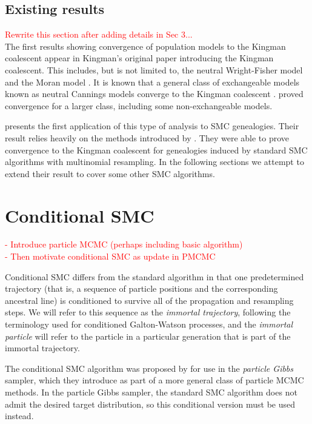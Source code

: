 \documentclass[fleqn]{article}
\theoremstyle{definition}
\begin{document}
\subsection{Existing results}
\textcolor{red}{
Rewrite this section after adding details in Sec 3...
}\\
The first results showing convergence of population models to the Kingman coalescent appear in Kingman's original paper \citep{kingman1982gene} introducing the Kingman coalescent. This includes, but is not limited to, the neutral Wright-Fisher model \citep{fisher1923, fisher1930, wright1931} and the Moran model \citep{moran1958}.
It is known that a general class of exchangeable models known as neutral Cannings models converge to the Kingman coalescent \citep[Section 2.2]{etheridge2011}.
\citet{mohle1998} proved convergence for a larger class, including some non-exchangeable models.

\citet{koskela2018} presents the first application of this type of analysis to SMC genealogies. Their result relies heavily on the methods introduced by \citet{mohle1998}.
They were able to prove convergence to the Kingman coalescent for genealogies induced by standard SMC algorithms with multinomial resampling.
In the following sections we attempt to extend their result to cover some other SMC algorithms.


\section{Conditional SMC}\label{sec:conditionalSMC}
\textcolor{red}{
- Introduce particle MCMC (perhaps including basic algorithm)\\
- Then motivate conditional SMC as update in PMCMC\\
}

Conditional SMC differs from the standard algorithm in that one predetermined trajectory (that is, a sequence of particle positions and the corresponding ancestral line) is conditioned to survive all of the propagation and resampling steps. 
We will refer to this sequence as the \emph{immortal trajectory}, following the terminology used for conditioned Galton-Watson processes, and the \emph{immortal particle} will refer to the particle in a particular generation that is part of the immortal trajectory.

The conditional SMC algorithm was proposed by \citet{andrieu2010} for use in the \emph{particle Gibbs} sampler, which they introduce as part of a more general class of particle MCMC methods. 
In the particle Gibbs sampler, the standard SMC algorithm does not admit the desired target distribution, so this conditional version must be used instead.
\end{document}
